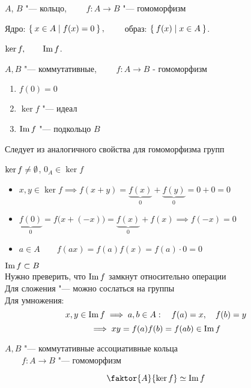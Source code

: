 \begin{definition}
	$ A $, $ B $ "--- кольцо, $ \qquad f : A \to B $ "--- гомоморфизм

	Ядро: $ \Set{x \in A | f(x) = 0}, \qquad $ образ: $ \Set{f(x) | x \in A} $.
\end{definition}

\begin{notation}
	$ \ker f, \qquad \operatorname{Im} f $.
\end{notation}

\begin{properties}
	$ A, B $ "--- коммутативные, $ \qquad f : A \to B $ - гомоморфизм
	\begin{enumerate}
		\item $ f(0) = 0 $

		\item $ \ker f $ "--- идеал

		\item $ \operatorname{Im} f $ "--- подкольцо $ B $
	\end{enumerate}
\end{properties}

\begin{eproof}
	\item Следует из аналогичного свойства для гомоморфизма групп

	\item $ \ker f \ne \emptyset $, \as $ 0_A \in \ker f $
	\begin{itemize}
		\item $ x, y \in \ker f \implies f(x + y) = \underbrace{f(x)}_0 + \underbrace{f(y)}_0 = 0 + 0 = 0 $
		\item $ \underbrace{f(0)}_0 = f \big( x + (-x) \big) = \underbrace{f(x)}_0 + f(x) \implies f(-x) = 0 $
		\item $ a \in A \qquad f(ax) = f(a)f(x) = f(a) \cdot 0 = 0 $
	\end{itemize}

	\item $ \operatorname{Im} f \subset B $ \\
	Нужно преверить, что $ \operatorname{Im} f $ замкнут относительно операции \\
	Для сложения "--- можно сослаться на группы \\
	Для умножения:
	$$ x, y \in \operatorname{Im} f \implies a, b \in A : \quad f(a) = x, \quad f(b) = y $$
	$$ \implies xy = f(a)f(b) = f(ab) \in \operatorname{Im} f $$
\end{eproof}

\begin{theorem}
	$ A, B $ "--- коммутативные ассоциативные кольца \\
	$ \qquad f : A \to B $ "--- гомоморфизм

	$$ \faktor{A}{\ker f} \simeq \Img f $$
\end{theorem}

